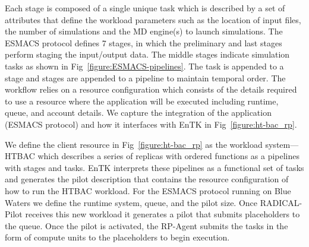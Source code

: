 
Each stage is composed of a single unique task which is described by a set of
attributes that define the workload parameters such as the location of input
files, the number of simulations and the MD engine(s) to launch simulations.
The ESMACS protocol defines 7 stages, in which the preliminary and last
stages perform staging the input/output data. The middle stages indicate
simulation tasks as shown in Fig~\ref{figure:ESMACS-pipelines}. The task is
appended to a stage and stages are appended to a pipeline to maintain
temporal order. The workflow relies on a resource configuration which
consists of the details required to use a resource where the application will
be executed including runtime, queue, and account details. We capture the
integration of the application (ESMACS protocol) and how it interfaces with
EnTK in Fig~\ref{figure:ht-bac_rp}.

We define the client resource in Fig~\ref{figure:ht-bac_rp} as the workload
system---HTBAC which describes a series of replicas with ordered functions as
a pipelines with stages and tasks. EnTK interprets these pipelines as a
functional set of tasks and generates the pilot description that contains the
resource configuration of how to run the HTBAC workload. For the ESMACS
protocol running on Blue Waters we define the runtime system, queue, and the
pilot size. Once RADICAL-Pilot receives this new workload it generates a
pilot that submits placeholders to the queue. Once the pilot is activated,
the RP-Agent submits the tasks in the form of compute units to the
placeholders to begin execution.

